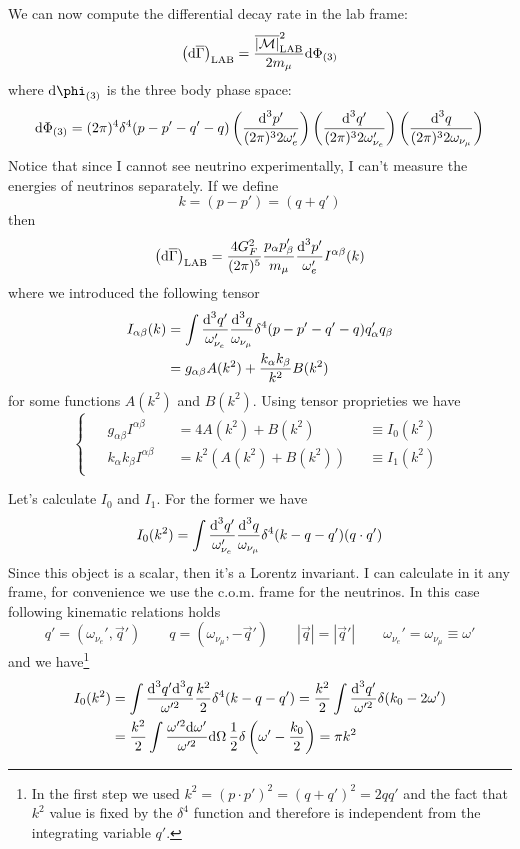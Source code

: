 \documentclass[TheoreticalPhy_ModB.tex]{subfiles}
\begin{document}
We can now compute the differential decay rate in the lab frame:
\[\left(\textup{d}\overline\Gamma\right)_{\text{LAB}}
=\frac{\overline{|\mathcal M|}^2_{\text{LAB}}}{2m_\mu}\textup{d}\Phi_{(3)}\]
where $\de\phi_{(3)}$ is the three body phase space:
\[\textup{d}\Phi_{(3)}=(2\pi)^4\delta^4(p-p'-q'-q)
\left(\frac{\textup{d}^3p'}{(2\pi)^32\omega_e'}\right)
\left(\frac{\textup{d}^3q'}{(2\pi)^32\omega_{\nu_e}'}\right)
\left(\frac{\textup{d}^3q}{(2\pi)^32\omega_{\nu_\mu}}\right)
\]
Notice that since I cannot see neutrino experimentally, I can't measure the energies of neutrinos separately.
If we define
\[k=(p-p')=(q+q')\]
then
\[\left(\textup{d}\overline\Gamma\right)_{\text{LAB}}
=\frac{4G_F^2}{(2\pi)^5}\frac{p_\alpha p'_\beta}{m_\mu}\frac{\textup{d}^3p'}{\omega_e'}I^{\alpha\beta}(k)
\]
where we introduced the following tensor
\begin{align*}
I_{\alpha\beta}(k)
&=\int\frac{\textup{d}^3q'}{\omega_{\nu_e}'}\frac{\textup{d}^3q}{\omega_{\nu_\mu}}\delta^4(p-p'-q'-q)q'_\alpha q_\beta\\
&=g_{\alpha\beta}A(k^2)+\frac{k_\alpha k_\beta}{k^2}B(k^2)
\end{align*}
for some functions $A(k^2)$ and $B(k^2)$. Using tensor proprieties we have
\begin{equation}\label{eqn:mu-decay-tensor-dec}
\begin{cases}
\begin{alignedat}{3}
&g_{\alpha\beta}I^{\alpha\beta}&&=4A(k^2)+B(k^2)&&\equiv I_0(k^2)\\
&k_\alpha k_\beta I^{\alpha\beta}&&=k^2(A(k^2)+B(k^2))&&\equiv I_1(k^2)
\end{alignedat}
\end{cases}
\end{equation}

Let's calculate $I_0$ and $I_1$. For the former we have
\[I_0(k^2)=\int\frac{\textup{d}^3q'}{\omega_{\nu_e}'}\frac{\textup{d}^3q}{\omega_{\nu_\mu}}\delta^4(k-q-q')(q\cdot q')\]
Since this object is a scalar, then it's a Lorentz invariant. I can calculate in it any frame, for convenience we use the c.o.m. frame for the neutrinos. In this case following kinematic relations holds
\[q'=(\omega_{\nu_e}', \vec q')
\qquad
q=(\omega_{\nu_\mu},-\vec q')
\qquad
|\vec q|=|\vec q'|
\qquad
\omega_{\nu_e}'=\omega_{\nu_\mu}\equiv\omega'
\]
and we have\footnote{In the first step we used $k^2=(p\cdot p')^2=(q+q')^2=2qq'$ and the fact that $k^2$ value is fixed by the $\delta^4$ function and therefore is independent from the integrating variable $q'$.}
\begin{align*}
I_0(k^2)&=
\int\frac{\textup{d}^3q'\textup{d}^3q}{\omega'^2}\frac{k^2}2\delta^4(k-q-q')
=\frac{k^2}2\int\frac{\textup{d}^3q'}{\omega'^2}\delta(k_0-2\omega')\\
&=\frac{k^2}2\int\frac{\omega'^2\textup{d}\omega'}{\omega'^2}\textup{d}\Omega\,\frac12\delta\left(\omega'-\frac{k_0}2\right)
=\pi k^2
\end{align*}
\end{document}
